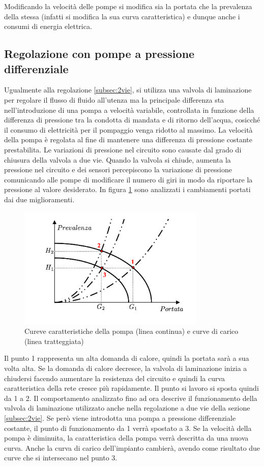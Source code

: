\documentclass[laurea,oneside,11pt]{USiena_tesiLM}
\begin{document}
Modificando la velocità delle pompe si modifica sia la portata che la prevalenza della stessa (infatti si modifica la sua curva caratteristica) e dunque anche i consumi di energia elettrica. 

\subsection{Regolazione con pompe a pressione differenziale}
Ugualmente alla regolazione \ref{subsec:2vie}, si utilizza una valvola di laminazione per regolare il flusso di fluido all'utenza ma la principale differenza sta nell'introduzione di una pompa a velocità variabile, controllata in funzione della differenza di pressione tra la condotta di mandata e di ritorno dell'acqua, cosicché il consumo di elettricità per il pompaggio venga ridotto al massimo.
 La velocità della pompa è regolata al fine di mantenere una differenza di pressione costante prestabilita. Le variazioni di pressione nel circuito sono causate dal grado di chiusura della valvola a due vie. Quando la valvola si chiude, aumenta la pressione nel circuito e dei sensori percepiscono la variazione di pressione comunicando alle pompe di modificare il numero di giri in modo da riportare la pressione al valore desiderato. In figura \ref{fig:giri_variabili} sono analizzati i cambiamenti portati dai due miglioramenti.

\begin{figure}[!ht]
\centering
\includegraphics[width=0.8\textwidth]{figure/giri_variabili}
\caption{Cureve caratteristiche della pompa (linea continua) e curve di carico (linea tratteggiata)}
\label{fig:giri_variabili}
\end{figure}

Il punto 1 rappresenta un alta domanda di calore, quindi la portata sarà a sua volta alta. Se la domanda di calore decresce, la valvola di laminazione inizia a chiudersi facendo aumentare la resistenza del circuito e quindi la curva caratteristica della rete cresce più rapidamente. Il punto si lavoro si sposta quindi da 1 a 2. Il comportamento analizzato fino ad ora descrive il funzionamento della valvola di laminazione utilizzato anche nella regolazione a due vie della sezione \ref{subsec:2vie}. Se però viene introdotta una pompa a pressione differenziale costante, il punto di funzionamento da 1 verrà spostato a 3. Se la velocità della pompa è diminuita, la caratteristica della pompa verrà descritta da una nuova curva. Anche la curva di carico dell'impianto cambierà, avendo come risultato due curve che si intersecano nel punto 3.      
\end{document}
